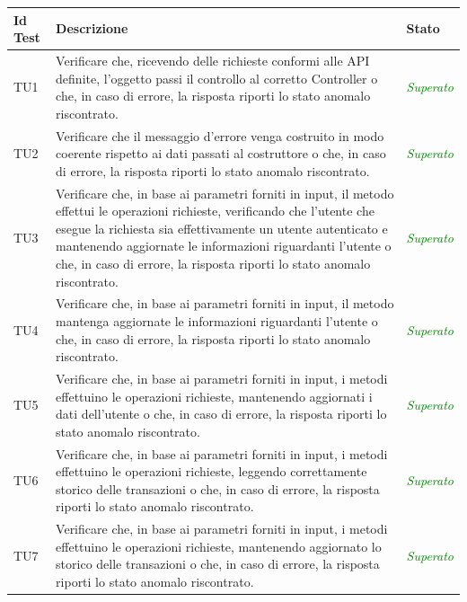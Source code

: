 	\normalsize
	\begin{longtable}{|>{\centering\arraybackslash}p{1.5cm}|>{\centering\arraybackslash}p{8cm} | >{\centering\arraybackslash}p{3.8cm}|}
		\hline \rowcolor{Gray}
		\textbf{Id Test} & \textbf{Descrizione} & \textbf{Stato}\\
		\hline
		\endhead
		\hypertarget{TU1}{TU1} & Verificare che, ricevendo delle richieste conformi alle API definite, l’oggetto passi il controllo al corretto Controller o che, in caso di errore, la risposta riporti lo stato anomalo riscontrato. & \textcolor{Green}{\textit{Superato}}\\ \hline
		\hypertarget{TU2}{TU2} & Verificare che il messaggio d’errore venga costruito in modo coerente rispetto ai dati passati al costruttore o che, in caso di errore, la risposta riporti lo stato anomalo riscontrato. & \textcolor{Green}{\textit{Superato}}\\ \hline
		\hypertarget{TU3}{TU3} & Verificare che, in base ai parametri forniti in input, il metodo effettui le operazioni richieste, verificando che l’utente che esegue la richiesta sia effettivamente un utente autenticato e mantenendo aggiornate le
		informazioni riguardanti l’utente
		o che, in caso di errore, la risposta riporti lo stato
		anomalo riscontrato. & \textcolor{Green}{\textit{Superato}}\\ \hline
		\hypertarget{TU4}{TU4} & Verificare che, in base ai parametri forniti in input, il metodo  mantenga aggiornate le informazioni riguardanti l’utente o che, in caso di errore, la risposta riporti lo stato anomalo riscontrato. & \textcolor{Green}{\textit{Superato}}\\ \hline
		\hypertarget{TU5}{TU5} & Verificare che, in base ai parametri forniti in input, i
		metodi effettuino le operazioni richieste, mantenendo
		aggiornati i dati dell'utente o che, in caso di
		errore, la risposta riporti lo stato anomalo riscontrato. & \textcolor{Green}{\textit{Superato}}\\ \hline
		\hypertarget{TU6}{TU6} & Verificare che, in base ai parametri forniti in input, i
		metodi effettuino le operazioni richieste, leggendo correttamente storico delle transazioni o che, in caso di errore, la risposta riporti lo stato anomalo riscontrato. & \textcolor{Green}{\textit{Superato}}\\ \hline
		\hypertarget{TU7}{TU7} & Verificare che, in base ai parametri forniti in input, i
		metodi effettuino le operazioni richieste, mantenendo
		aggiornato lo storico delle transazioni o che, in caso di errore, la risposta riporti lo stato anomalo riscontrato. & \textcolor{Green}{\textit{Superato}}\\ \hline

\end{longtable}
